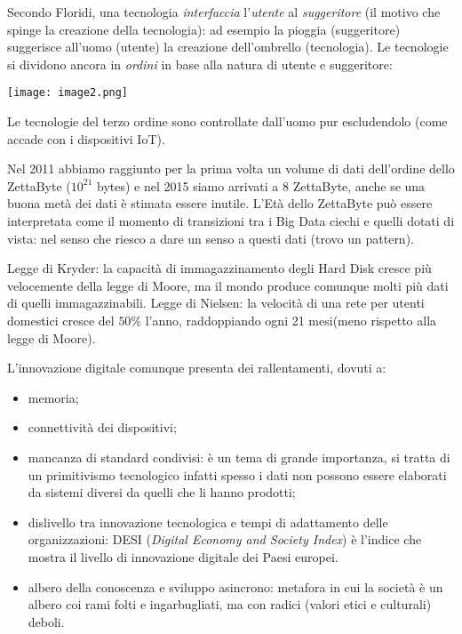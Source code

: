 \documentclass[a4page, 11pt]{article}
\begin{document}
Secondo Floridi, una tecnologia \textit{interfaccia} l'\textit{utente} al \textit{suggeritore} (il motivo che spinge la creazione della tecnologia): ad esempio la pioggia (suggeritore) suggerisce all'uomo (utente) la creazione dell'ombrello (tecnologia).
Le tecnologie si dividono ancora in \textit{ordini} in base alla natura di utente e suggeritore:
\begin{center}
  \texttt{[image: image2.png]}
\end{center}
Le tecnologie del terzo ordine sono controllate dall'uomo pur escludendolo (come accade con i dispositivi IoT). \newline

Nel 2011 abbiamo raggiunto per la prima volta un volume di dati dell'ordine dello ZettaByte ($10^{21}$ bytes) e nel 2015 siamo arrivati a $8$ ZettaByte, anche se una buona metà dei dati è stimata essere inutile.
L'Età dello ZettaByte può essere interpretata come il momento di transizioni tra i Big Data ciechi e quelli dotati di vista: nel senso che riesco a dare un senso a questi dati (trovo un pattern).

Legge di Kryder: la capacità di immagazzinamento degli Hard Disk cresce più velocemente della legge di Moore, ma il mondo produce comunque molti più dati di quelli immagazzinabili. \newline
Legge di Nielsen: la velocità di una rete per utenti domestici cresce del $50\%$ l'anno, raddoppiando ogni 21 mesi(meno rispetto alla legge di Moore).

L'innovazione digitale comunque presenta dei rallentamenti, dovuti a:
\begin{itemize}
  \item memoria;
  \item connettività dei dispositivi;
  \item mancanza di standard condivisi: è un tema di grande importanza, si tratta di un primitivismo tecnologico infatti spesso i dati non possono essere elaborati da sistemi diversi da quelli che li hanno prodotti;
  \item dislivello tra innovazione tecnologica e tempi di adattamento delle organizzazioni: DESI (\textit{Digital Economy and Society Index}) è l'indice che mostra il livello di innovazione digitale dei Paesi europei.
  \item albero della conoscenza e sviluppo asincrono: metafora in cui la società è un albero coi rami folti e ingarbugliati, ma con radici (valori etici e culturali) deboli.
\end{itemize}
\end{document}
